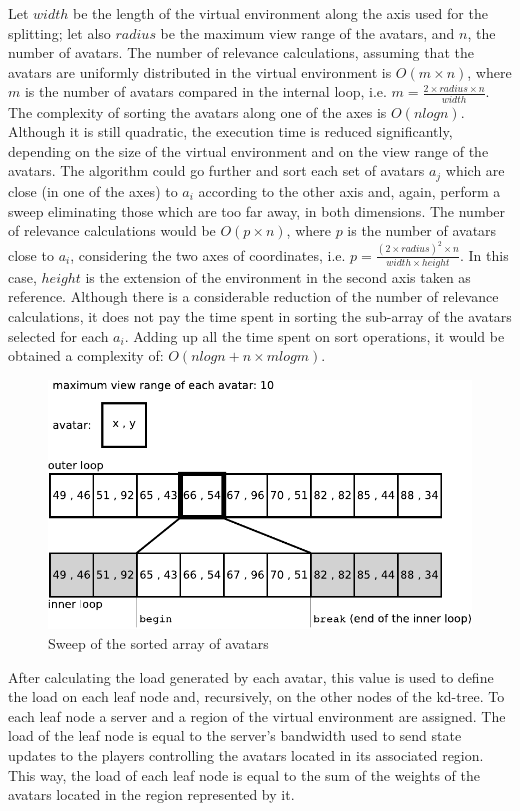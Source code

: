 \documentclass[acmtocl]{acmtrans2m}
\begin{document}
Let $width$ be the length of the virtual environment along the axis used for the splitting; let also $radius$ be the maximum view range of the avatars, and $n$, the number of avatars. The number of relevance calculations, assuming that the avatars are uniformly distributed in the virtual environment is \mbox{$O(m \times n)$}, where $m$ is the number of avatars compared in the internal loop, i.e. \mbox{$m = \frac{2 \times radius \times n}{width}$}. The complexity of sorting the avatars along one of the axes is $O(nlogn)$. Although it is still quadratic, the execution time is reduced significantly, depending on the size of the virtual environment and on the view range of the avatars. The algorithm could go further and sort each set of avatars $a_j$ which are close (in one of the axes) to $a_i$ according to the other axis and, again, perform a sweep eliminating those which are too far away, in both dimensions. The number of relevance calculations would be \mbox{$O(p \times n)$}, where $p$ is the number of avatars close to $a_i$, considering the two axes of coordinates, i.e. \mbox{$p = \frac{(2 \times radius)^2 \times n}{width \times height}$}. In this case, $height$ is the extension of the environment in the second axis taken as reference. Although there is a considerable reduction of the number of relevance calculations, it does not pay the time spent in sorting the sub-array of the avatars selected for each $a_i$. Adding up all the time spent on sort operations, it would be obtained a complexity of: \mbox{$O(nlogn + n \times mlogm)$}.

\begin{figure}
  \centering
  \includegraphics[width=0.8\linewidth]{images/sweep}
  \caption{Sweep of the sorted array of avatars}
   \label{fig:sweep}
\end{figure}

After calculating the load generated by each avatar, this value is used to define the load on each leaf node and, recursively, on the other nodes of the kd-tree. To each leaf node a server and a region of the virtual environment are assigned. The load of the leaf node is equal to the server's bandwidth used to send state updates to the players controlling the avatars located in its associated region. This way, the load of each leaf node is equal to the sum of the weights of the avatars located in the region represented by it.
\end{document}

